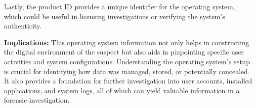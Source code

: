 Lastly, the product ID provides a unique identifier for the operating system, which could be useful in licensing investigations or verifying the system's authenticity.

\textbf{Implications:} This operating system information not only helps in constructing the digital environment of the suspect but also aids in pinpointing specific user activities and system configurations. Understanding the operating system's setup is crucial for identifying how data was managed, stored, or potentially concealed. It also provides a foundation for further investigation into user accounts, installed applications, and system logs, all of which can yield valuable information in a forensic investigation.
